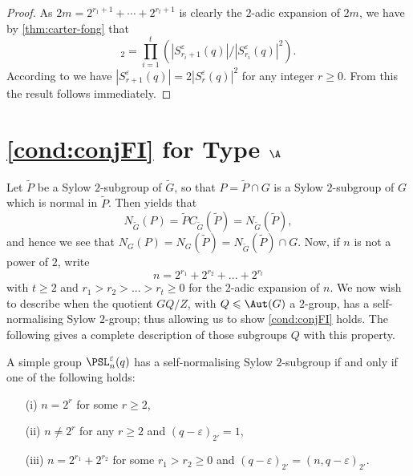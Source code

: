 \documentclass[eqthmnum, nocolour]{jt-calcs}
\newcommand{\wt}[1]{\widetilde{#1}}
\renewcommand{\epsilon}{\varepsilon}
\begin{document}
\begin{proof}
As $2m = 2^{r_1+1} + \cdots + 2^{r_t+1}$ is clearly the $2$-adic expansion of $2m$, we have by \cref{thm:carter-fong} that
\begin{equation*}
[\GL_{2m}^{\varepsilon}(q) : \GL_m^{\varepsilon}(q)^2]_2 = \prod_{i = 1}^t \left(|S_{r_i+1}^{\varepsilon}(q)|/|S_{r_i}^{\varepsilon}(q)|^2\right).
\end{equation*}
According to \cite[Eq.\ (4)]{carter-fong:1964:the-Sylow-2-subgroups} we have $|S_{r+1}^{\varepsilon}(q)| = 2|S_r^{\varepsilon}(q)|^2$ for any integer $r \geqslant 0$. From this the result follows immediately.
\end{proof}

\section{\cref{cond:conjFI} for Type $\A$}
\begin{pa}
Let $\wt{P}$ be a Sylow $2$-subgroup of $\wt{G}$, so that $P=\wt{P}\cap G$ is a Sylow $2$-subgroup of $G$ which is normal in $\wt{P}$.  Then \cite[Theorem 1]{kondratiev:2005:normalizers-of-sylow-2-subgroups} yields that
\begin{equation}\label{CF1}
N_{\wt{G}}(P) = \wt{P}C_{\wt{G}}(\wt{P}) = N_{\wt{G}}(\wt{P}),
\end{equation}
and hence we see that $N_G(P)=N_G(\wt{P})=N_{\wt{G}}(\wt{P})\cap G$. Now, if $n$ is not a power of $2$, write
\begin{equation}\label{2adic}
n=2^{r_1}+2^{r_2}+...+2^{r_t}
\end{equation}
with $t\geq 2$ and $r_1>r_2>...>r_t\geq 0$ for the $2$-adic expansion of $n$. We now wish to describe when the quotient $GQ/Z$, with $Q \leqslant \Aut(G)$ a $2$-group, has a self-normalising Sylow $2$-group; thus allowing us to show \cref{cond:conjFI} holds. The following gives a complete description of those subgroups $Q$ with this property.
\end{pa}

\begin{lemma}\label{lem:whenSN2Ssimple}
A simple group $\PSL_n^\epsilon(q)$ has a self-normalising Sylow $2$-subgroup if and only if one of the following holds:
\begin{itemize}
	\item[(i)] $n = 2^r$ for some $r\geqslant 2$,
	\item[(ii)] $ n \neq 2^r$ for any $r \geqslant 2$ and $(q-\epsilon)_{2'} = 1$,
	\item[(iii)] $n = 2^{r_1}+2^{r_2}$ for some $r_1 > r_2 \geqslant 0$ and $(q-\epsilon)_{2'} = (n,q-\epsilon)_{2'}$.
\end{itemize}
\end{lemma}
\end{document}
